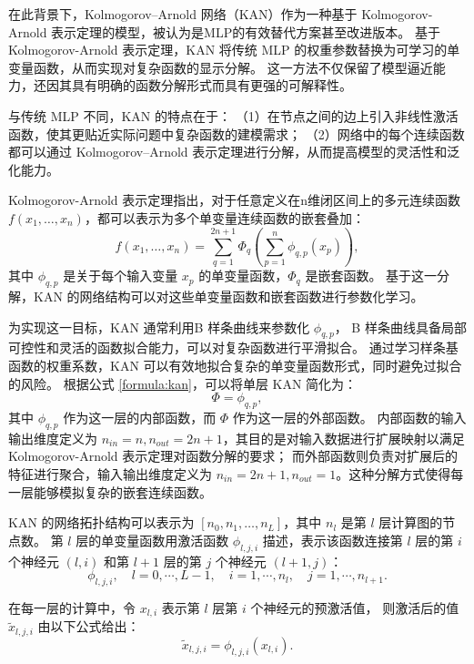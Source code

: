 在此背景下，Kolmogorov–Arnold 网络（KAN）\cite{kan}作为一种基于 Kolmogorov-Arnold 表示定理\cite{kan_theorem}的模型，被认为是MLP的有效替代方案甚至改进版本。
基于Kolmogorov-Arnold 表示定理，KAN 将传统 MLP 的权重参数替换为可学习的单变量函数，从而实现对复杂函数的显示分解。
这一方法不仅保留了模型逼近能力，还因其具有明确的函数分解形式而具有更强的可解释性。

与传统 MLP 不同，KAN 的特点在于：
（1）在节点之间的边上引入非线性激活函数，使其更贴近实际问题中复杂函数的建模需求；
（2）网络中的每个连续函数都可以通过 Kolmogorov–Arnold 表示定理进行分解，从而提高模型的灵活性和泛化能力。

Kolmogorov-Arnold 表示定理指出，对于任意定义在n维闭区间上的多元连续函数$f(x_1, \ldots, x_n)$，都可以表示为多个单变量连续函数的嵌套叠加：
\begin{equation}
    \label{formula:kan}
f(x_1, \ldots, x_n)=\sum_{q=1}^{2 n+1} \Phi_q(\sum_{p=1}^n \phi_{q, p}(x_p)),
\end{equation}
其中 $\phi_{q, p}$ 是关于每个输入变量 $x_p$ 的单变量函数，$\Phi_q$ 是嵌套函数。
基于这一分解，KAN 的网络结构可以对这些单变量函数和嵌套函数进行参数化学习。

为实现这一目标，KAN 通常利用B 样条曲线来参数化 $\phi_{q, p}$，
B 样条曲线具备局部可控性和灵活的函数拟合能力，可以对复杂函数进行平滑拟合。
通过学习样条基函数的权重系数，KAN 可以有效地拟合复杂的单变量函数形式，同时避免过拟合的风险。
根据公式 \eqref{formula:kan}，可以将单层 KAN 简化为：
\begin{equation}
    \Phi = {\phi_{q,p}},
\end{equation}
其中 $\phi_{q,p}$ 作为这一层的内部函数，而 $\Phi$ 作为这一层的外部函数。
内部函数的输入输出维度定义为 $n_{in}=n, n_{out}=2n+1$，其目的是对输入数据进行扩展映射以满足 Kolmogorov-Arnold 表示定理对函数分解的要求；
而外部函数则负责对扩展后的特征进行聚合，输入输出维度定义为 $n_{in}=2n+1, n_{out}=1$。这种分解方式使得每一层能够模拟复杂的嵌套连续函数。

KAN 的网络拓扑结构可以表示为 $[n_0, n_1, …, n_L]$，其中 $n_l$ 是第 $l$ 层计算图的节点数。
第 $l$ 层的单变量函数用激活函数 $\phi_{l,j,i}$ 描述，表示该函数连接第 $l$ 层的第 $i$ 个神经元 $(l,i)$ 和第 $l+1$ 层的第 $j$ 个神经元 $(l+1,j)$：
\begin{equation}
    \phi_{l, j, i}, \quad l=0, \cdots, L-1, \quad i=1, \cdots, n_l, \quad j=1, \cdots, n_{l+1}.
\end{equation}

在每一层的计算中，令 $x_{l,i}$ 表示第 $l$ 层第 $i$ 个神经元的预激活值，
则激活后的值 $\tilde{x}_{l,j,i}$ 由以下公式给出：
\begin{equation}
    \tilde{x}_{l,j,i} = \phi_{l,j,i}(x_{l,i}).
\end{equation}

